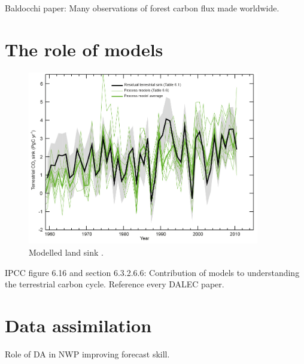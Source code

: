 \documentclass[11pt]{article}
\begin{document}
Baldocchi paper: Many observations of forest carbon flux made worldwide.

\section{The role of models}

\begin{figure}[ht]
    \centering
    \includegraphics[width=0.9\textwidth]{ipcc_fig6_16.jpg}
    \caption{Modelled land sink \citep{ciais2014carbon}.}
    \label{fig:ipcc_fig6.16}
\end{figure}

IPCC figure 6.16 and section 6.3.2.6.6: Contribution of models to understanding the terrestrial carbon cycle. Reference every DALEC paper.


\section{Data assimilation}

Role of DA in NWP improving forecast skill. 


{}
\end{document}
